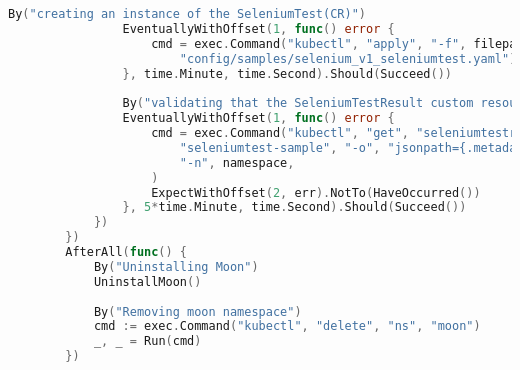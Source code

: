 \begin{lstlisting}[language={Go}]
				By("creating an instance of the SeleniumTest(CR)")
				EventuallyWithOffset(1, func() error {
					cmd = exec.Command("kubectl", "apply", "-f", filepath.Join(projectDir,
						"config/samples/selenium_v1_seleniumtest.yaml"), "-n", namespace)
				}, time.Minute, time.Second).Should(Succeed())
	
				By("validating that the SeleniumTestResult custom resource is created or updated")
				EventuallyWithOffset(1, func() error {
					cmd = exec.Command("kubectl", "get", "seleniumtestresult",
						"seleniumtest-sample", "-o", "jsonpath={.metadata.creationTimestamp}",
						"-n", namespace,
					)
					ExpectWithOffset(2, err).NotTo(HaveOccurred())
				}, 5*time.Minute, time.Second).Should(Succeed())
			})
		})
		AfterAll(func() {
			By("Uninstalling Moon")
			UninstallMoon()
	
			By("Removing moon namespace")
			cmd := exec.Command("kubectl", "delete", "ns", "moon")
			_, _ = Run(cmd)
		})	
\end{lstlisting}